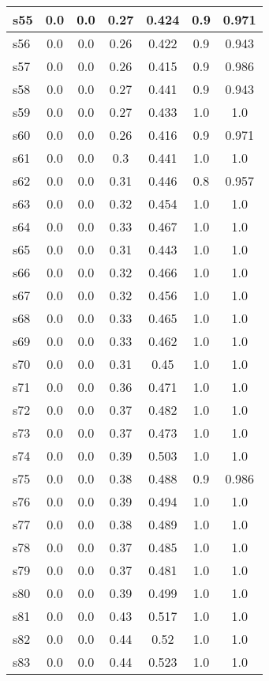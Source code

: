 \documentclass{article}
\begin{document}
\begin{tabular}{|l|c|c|c|c|c|c|}
s55 &0.0 & 0.0 & 0.27 & 0.424 & 0.9 & 0.971\\
\hline
s56 &0.0 & 0.0 & 0.26 & 0.422 & 0.9 & 0.943\\
\hline
s57 &0.0 & 0.0 & 0.26 & 0.415 & 0.9 & 0.986\\
\hline
s58 &0.0 & 0.0 & 0.27 & 0.441 & 0.9 & 0.943\\
\hline
s59 &0.0 & 0.0 & 0.27 & 0.433 & 1.0 & 1.0\\
\hline
s60 &0.0 & 0.0 & 0.26 & 0.416 & 0.9 & 0.971\\
\hline
s61 &0.0 & 0.0 & 0.3 & 0.441 & 1.0 & 1.0\\
\hline
s62 &0.0 & 0.0 & 0.31 & 0.446 & 0.8 & 0.957\\
\hline
s63 &0.0 & 0.0 & 0.32 & 0.454 & 1.0 & 1.0\\
\hline
s64 &0.0 & 0.0 & 0.33 & 0.467 & 1.0 & 1.0\\
\hline
s65 &0.0 & 0.0 & 0.31 & 0.443 & 1.0 & 1.0\\
\hline
s66 &0.0 & 0.0 & 0.32 & 0.466 & 1.0 & 1.0\\
\hline
s67 &0.0 & 0.0 & 0.32 & 0.456 & 1.0 & 1.0\\
\hline
s68 &0.0 & 0.0 & 0.33 & 0.465 & 1.0 & 1.0\\
\hline
s69 &0.0 & 0.0 & 0.33 & 0.462 & 1.0 & 1.0\\
\hline
s70 &0.0 & 0.0 & 0.31 & 0.45 & 1.0 & 1.0\\
\hline
s71 &0.0 & 0.0 & 0.36 & 0.471 & 1.0 & 1.0\\
\hline
s72 &0.0 & 0.0 & 0.37 & 0.482 & 1.0 & 1.0\\
\hline
s73 &0.0 & 0.0 & 0.37 & 0.473 & 1.0 & 1.0\\
\hline
s74 &0.0 & 0.0 & 0.39 & 0.503 & 1.0 & 1.0\\
\hline
s75 &0.0 & 0.0 & 0.38 & 0.488 & 0.9 & 0.986\\
\hline
s76 &0.0 & 0.0 & 0.39 & 0.494 & 1.0 & 1.0\\
\hline
s77 &0.0 & 0.0 & 0.38 & 0.489 & 1.0 & 1.0\\
\hline
s78 &0.0 & 0.0 & 0.37 & 0.485 & 1.0 & 1.0\\
\hline
s79 &0.0 & 0.0 & 0.37 & 0.481 & 1.0 & 1.0\\
\hline
s80 &0.0 & 0.0 & 0.39 & 0.499 & 1.0 & 1.0\\
\hline
s81 &0.0 & 0.0 & 0.43 & 0.517 & 1.0 & 1.0\\
\hline
s82 &0.0 & 0.0 & 0.44 & 0.52 & 1.0 & 1.0\\
\hline
s83 &0.0 & 0.0 & 0.44 & 0.523 & 1.0 & 1.0\\

\end{tabular}
\end{document}
